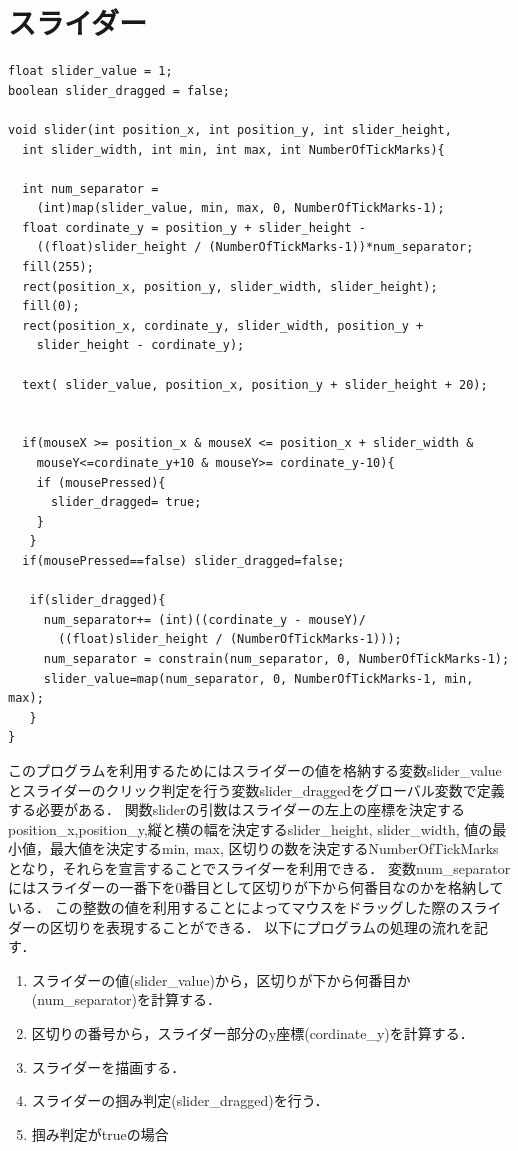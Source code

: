 \section{スライダー}\label{sec:slider}
\begin{screen}
{\small
\begin{verbatim}
float slider_value = 1;
boolean slider_dragged = false;

void slider(int position_x, int position_y, int slider_height,
  int slider_width, int min, int max, int NumberOfTickMarks){
  
  int num_separator =
    (int)map(slider_value, min, max, 0, NumberOfTickMarks-1);
  float cordinate_y = position_y + slider_height - 
    ((float)slider_height / (NumberOfTickMarks-1))*num_separator;
  fill(255);
  rect(position_x, position_y, slider_width, slider_height);
  fill(0);
  rect(position_x, cordinate_y, slider_width, position_y +
    slider_height - cordinate_y);
  
  text( slider_value, position_x, position_y + slider_height + 20);
  
  
  if(mouseX >= position_x & mouseX <= position_x + slider_width &
    mouseY<=cordinate_y+10 & mouseY>= cordinate_y-10){
    if (mousePressed){
      slider_dragged= true;
    }
   }
  if(mousePressed==false) slider_dragged=false; 
   
   if(slider_dragged){
     num_separator+= (int)((cordinate_y - mouseY)/
       ((float)slider_height / (NumberOfTickMarks-1)));
     num_separator = constrain(num_separator, 0, NumberOfTickMarks-1);
     slider_value=map(num_separator, 0, NumberOfTickMarks-1, min, max);
   }
}
\end{verbatim}}
\end{screen}

\newpage

このプログラムを利用するためにはスライダーの値を格納する変数slider\_valueとスライダーのクリック判定を行う変数slider\_draggedをグローバル変数で定義する必要がある．
関数sliderの引数はスライダーの左上の座標を決定するposition\_x,position\_y,縦と横の幅を決定するslider\_height, slider\_width, 
値の最小値，最大値を決定するmin, max, 区切りの数を決定するNumberOfTickMarksとなり，それらを宣言することでスライダーを利用できる．
変数num\_separatorにはスライダーの一番下を0番目として区切りが下から何番目なのかを格納している．
この整数の値を利用することによってマウスをドラッグした際のスライダーの区切りを表現することができる．
以下にプログラムの処理の流れを記す．

\begin{enumerate}
  \item スライダーの値(slider\_value)から，区切りが下から何番目か(num\_separator)を計算する．
  \item 区切りの番号から，スライダー部分のy座標(cordinate\_y)を計算する．
  \item スライダーを描画する．
  \item スライダーの掴み判定(slider\_dragged)を行う．
   \item 掴み判定がtrueの場合
\end{enumerate}

